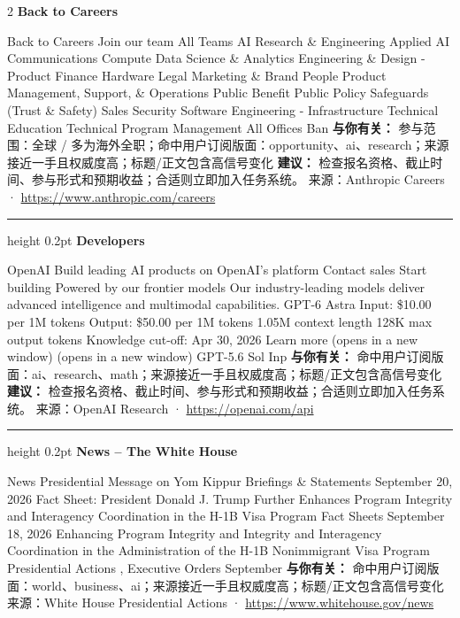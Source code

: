 \documentclass[10.5pt]{ctexart}
\begin{document}
\begin{multicols}{2}
{\large\bfseries Back to Careers}\par
Back to Careers Join our team All Teams AI Research \& Engineering Applied AI Communications Compute Data Science \& Analytics Engineering \& Design - Product Finance Hardware Legal Marketing \& Brand People Product Management, Support, \& Operations Public Benefit Public Policy Safeguards (Trust \& Safety) Sales Security Software Engineering - Infrastructure Technical Education Technical Program Management All Offices Ban
\textbf{与你有关：} 参与范围：全球 / 多为海外全职；命中用户订阅版面：opportunity、ai、research；来源接近一手且权威度高；标题/正文包含高信号变化
\textbf{建议：} 检查报名资格、截止时间、参与形式和预期收益；合适则立即加入任务系统。
{\footnotesize\color{ormuted} 来源：Anthropic Careers · \url{https://www.anthropic.com/careers}}
\vspace{2mm}
\hrule height 0.2pt
\vspace{2mm}
{\large\bfseries Developers}\par
OpenAI Build leading AI products on OpenAI’s platform Contact sales Start building Powered by our frontier models Our industry-leading models deliver advanced intelligence and multimodal capabilities. GPT-6 Astra Input: \$10.00 per 1M tokens Output: \$50.00 per 1M tokens 1.05M context length 128K max output tokens Knowledge cut-off: Apr 30, 2026 Learn more (opens in a new window) (opens in a new window) GPT-5.6 Sol Inp
\textbf{与你有关：} 命中用户订阅版面：ai、research、math；来源接近一手且权威度高；标题/正文包含高信号变化
\textbf{建议：} 检查报名资格、截止时间、参与形式和预期收益；合适则立即加入任务系统。
{\footnotesize\color{ormuted} 来源：OpenAI Research · \url{https://openai.com/api}}
\vspace{2mm}
\hrule height 0.2pt
\vspace{2mm}
{\large\bfseries News – The White House}\par
News Presidential Message on Yom Kippur Briefings \& Statements September 20, 2026 Fact Sheet: President Donald J. Trump Further Enhances Program Integrity and Interagency Coordination in the H-1B Visa Program Fact Sheets September 18, 2026 Enhancing Program Integrity and Integrity and Interagency Coordination in the Administration of the H-1B Nonimmigrant Visa Program Presidential Actions , Executive Orders September
\textbf{与你有关：} 命中用户订阅版面：world、business、ai；来源接近一手且权威度高；标题/正文包含高信号变化
{\footnotesize\color{ormuted} 来源：White House Presidential Actions · \url{https://www.whitehouse.gov/news}}

\end{multicols}
\end{document}
